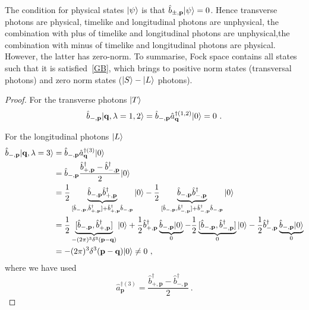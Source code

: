     The condition for physical states $\vert\psi\rangle$ is that $\hat b_{\pm, \mathbf p} \vert\psi\rangle = 0$. Hence transverse photons are physical, timelike and longitudinal photons are unphysical, the combination with plus of timelike and longitudinal photons are unphysical,the combination with minus of timelike and longitudinal photons are physical. However, the latter has zero-norm. To summarise, Fock space contains all states such that it is satisfied~\eqref{GB}, which brings to positive norm states (transversal photons) and zero norm states ($\vert S\rangle - \vert L\rangle$ photons).
    \begin{proof}
        For the transverse photons $\vert T\rangle$
        \begin{equation*}
            \hat b_{-, \mathbf p} \vert\mathbf q, \lambda= 1,2\rangle = \hat b_{-, \mathbf p} \hat a_{\mathbf q}^{\dagger (1,2)} \vert0\rangle = 0 ~.
        \end{equation*}

        For the longitudinal photons $\vert L\rangle$
        \begin{equation*}
        \begin{aligned}
            \hat b_{-, \mathbf p} \vert\mathbf q, \lambda=3\rangle & = \hat b_{-, \mathbf p} \hat a_{\mathbf q}^{\dagger (3)} \vert0\rangle \\ & = \hat b_{-, \mathbf p} \frac{\hat b^\dagger_{+, \mathbf p} - \hat b^\dagger_{-, \mathbf p}}{2} \vert0\rangle \\ &  = \frac{1}{2} \underbrace{\hat b_{-, \mathbf p} \hat b^\dagger_{+, \mathbf p}}_{[\hat b_{-, \mathbf p} ,\hat b^\dagger_{+, \mathbf p}] + \hat b^\dagger_{+, \mathbf p} \hat b_{-, \mathbf p} } \vert0\rangle - \frac{1}{2} \underbrace{\hat b_{-, \mathbf p} \hat b^\dagger_{-, \mathbf p}}_{[\hat b_{-, \mathbf p}, \hat b^\dagger_{-, \mathbf p}] + \hat b^\dagger_{-, \mathbf p} \hat b_{-, \mathbf p}} \vert0\rangle \\ & = \frac{1}{2} \underbrace{[\hat b_{-, \mathbf p} ,\hat b^\dagger_{+, \mathbf p}]}_{- (2\pi)^3 \delta^3 (\mathbf p - \mathbf q)} \vert0\rangle + \frac{1}{2} \hat b^\dagger_{+, \mathbf p} \underbrace{\hat b_{-, \mathbf p} \vert0\rangle}_0 - \frac{1}{2} \underbrace{[\hat b_{-, \mathbf p}, \hat b^\dagger_{-, \mathbf p}]}_{0} \vert0\rangle - \frac{1}{2} \hat b^\dagger_{-, \mathbf p} \underbrace{\hat b_{-, \mathbf p} \vert0\rangle}_0 \\ & = - (2\pi)^3 \delta^3 (\mathbf p - \mathbf q) \vert0\rangle \neq 0 ~,
        \end{aligned}
        \end{equation*}
        where we have used 
        \begin{equation*}
            \hat a^{\dagger (3)}_{\mathbf p} = \frac{\hat b^\dagger_{+, \mathbf p} - \hat b^\dagger_{-, \mathbf p}}{2} ~.
        \end{equation*}


\end{proof}
